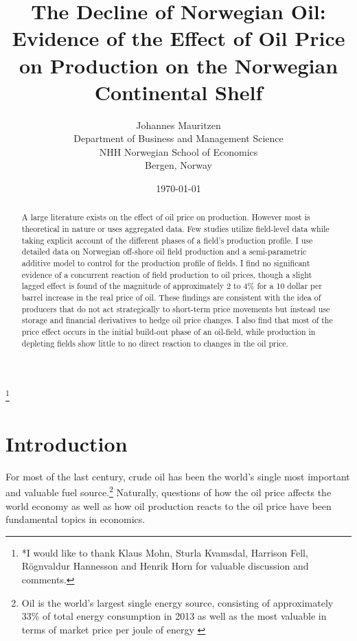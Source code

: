 \documentclass[12pt]{article}
\title{The Decline of Norwegian Oil: Evidence of the Effect of Oil Price on Production on the Norwegian Continental Shelf}
\author{Johannes Mauritzen \\
		Department of Business and Management Science\\
        NHH Norwegian School of Economics\\
        Bergen, Norway \\	           
		}
\date{\today}
\begin{document}
\begin{spacing}{1} %
	\maketitle


\begin{abstract}
A large literature exists on the effect of oil price on production.  However most is theoretical in nature or uses aggregated data.  Few studies utilize field-level data while taking explicit account of the different phases of a field's production profile. I use detailed data on Norwegian off-shore oil field production and a semi-parametric additive model to control for the production profile of fields.  I find no significant evidence of a concurrent reaction of field production to oil prices, though a slight lagged effect is found of the magnitude of approximately 2 to 4\% for a 10 dollar per barrel increase in the real price of oil.  These findings are consistent with the idea of producers that do not act strategically to short-term price movements but instead use storage and financial derivatives to hedge oil price changes.  I also find that most of the price effect occurs in the initial build-out phase of an oil-field, while production in depleting fields show little to no direct reaction to changes in the oil price.    
\end{abstract}

\thanks{*I would like to thank Klaus Mohn, Sturla Kvamsdal, Harrison Fell, Rögnvaldur Hannesson and Henrik Horn for valuable discussion and comments.}

\end{spacing}
\section{Introduction}

For most of the last century, crude oil has been the world’s single most important and valuable fuel source.\footnote{Oil is the world's largest single energy source, consisting of approximately 33\% of total energy consumption in 2013 as well as the most valuable in terms of market price per joule of energy \citep{british_petroleum_statistical_2013}} Naturally, questions of how the oil price affects the world economy as well as how oil production reacts to the oil price have been fundamental topics in economics. 
\end{document}
